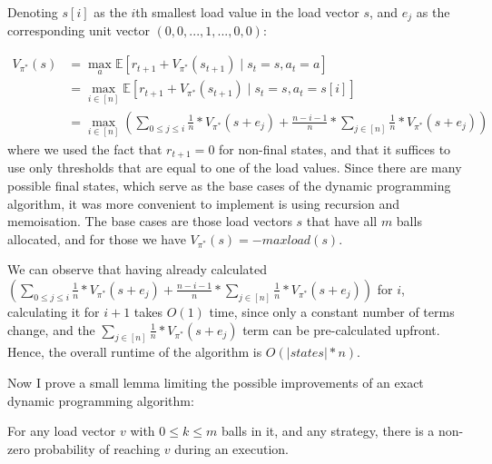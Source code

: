 Denoting $s[i]$ as the $i$th smallest load value in the load vector $s$, and $e_j$ as the corresponding unit vector $(0, 0, ... , 1, ..., 0, 0)$: 

\begin{equation} \label{eq:twothinning-dynamicprogramming}
\begin{split}
    V_{\pi^*}(s) &= \max_a \mathbb{E} [r_{t+1} + V_{\pi^*}(s_{t+1}) \mid s_t=s, a_t=a] \\
    &= \max_{i \in [n]} \mathbb{E} [r_{t+1} + V_{\pi^*}(s_{t+1}) \mid s_t=s, a_t=s[i]] \\
    &= \max_{i \in [n]} (\sum_{0\leq j \leq i} \frac{1}{n}*V_{\pi^*}(s+e_j) + \frac{n-i-1}{n} * \sum_{j \in [n]} \frac{1}{n}*V_{\pi^*}(s+e_j))
\end{split}
\end{equation}
where we used the fact that $r_{t+1}=0$ for non-final states, and that it suffices to use only thresholds that are equal to one of the load values. Since there are many possible final states, which serve as the base cases of the dynamic programming algorithm, it was more convenient to implement is using recursion and memoisation. The base cases are those load vectors $s$ that have all $m$ balls allocated, and for those we have $V_{\pi^*}(s)=-maxload(s)$. 


We can observe that having already calculated $(\sum_{0\leq j \leq i} \frac{1}{n}*V_{\pi^*}(s+e_j) + \frac{n-i-1}{n} * \sum_{j \in [n]} \frac{1}{n}*V_{\pi^*}(s+e_j))$ for $i$, calculating it for $i+1$ takes $O(1)$ time, since only a constant number of terms change, and the $\sum_{j \in [n]} \frac{1}{n}*V_{\pi^*}(s+e_j)$ term can be pre-calculated upfront. Hence, the overall runtime of the algorithm is $O(|states|*n)$.\


Now I prove a small lemma limiting the possible improvements of an exact dynamic programming algorithm:


\begin{lemma} \label{lemma: everystatereachable}
For any load vector $v$ with $0\leq k\leq m$ balls in it, and any strategy, there is a non-zero probability of reaching $v$ during an execution.
\end{lemma}

